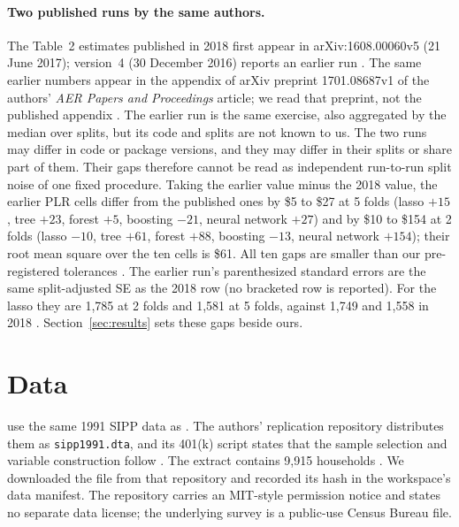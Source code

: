 \documentclass[11pt]{article}
\newcommand{\var}[1]{\texttt{#1}}
\begin{document}
\paragraph{Two published runs by the same authors.} The Table~2 estimates published in
2018 first appear in arXiv:1608.00060v5 (21 June 2017); version~4 (30 December 2016)
reports an earlier run \citep{chernozhukov2018dml,chernozhukov2016dmlv4}. The same
earlier numbers appear in the appendix of arXiv preprint 1701.08687v1 of the authors'
\emph{AER Papers and Proceedings} article; we read that preprint, not the published
appendix \citep{chernozhukov2017aerpp,chernozhukov2016dmlv4}. The earlier run is the same
exercise, also aggregated by the median over splits, but its code and splits are not
known to us. The two runs may differ in code or package versions, and they may differ in
their splits or share part of them. Their gaps therefore cannot be read as independent
run-to-run split noise of one fixed procedure. Taking the earlier value minus the 2018 value, the earlier PLR
cells differ from the published ones by \$5 to \$27 at 5 folds
(lasso $+15$, tree $+23$, forest $+5$, boosting $-21$, neural network $+27$) and by \$10
to \$154 at 2 folds (lasso $-10$, tree $+61$, forest $+88$, boosting $-13$, neural network
$+154$); their root mean square over the ten cells is \$61. All ten gaps are smaller
than our pre-registered tolerances
\citep{chernozhukov2017aerpp,chernozhukov2016dmlv4,chernozhukov2018dml}. The earlier
run's parenthesized standard errors are the same split-adjusted SE as the 2018 row (no
bracketed row is reported). For the lasso they are 1,785 at 2 folds and 1,581 at 5
folds, against 1,749 and 1,558 in 2018 \citep{chernozhukov2017aerpp,chernozhukov2016dmlv4}.
Section~\ref{sec:results} sets these gaps beside ours.

\section{Data}
\label{sec:data}

\citet{chernozhukov2018dml} use the same 1991 SIPP data as \citet{chernozhukov2004}.
The authors' replication repository distributes them as \var{sipp1991.dta}, and its
401(k) script states that the sample selection and variable construction follow
\citet{abadie2003} \citep{dmlongithub}. The extract contains 9,915 households
\citep{belloni2017,ahrens2024ddml,doubleml401kdocs}. We downloaded the file from that
repository and recorded its hash in the workspace's data manifest. The repository carries
an MIT-style permission notice and states no separate data license; the underlying
survey is a public-use Census Bureau file.
\end{document}
